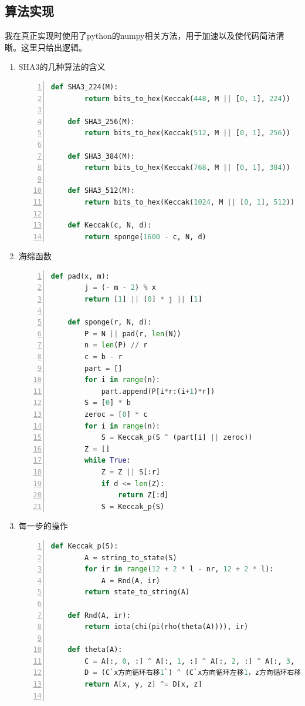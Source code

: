 \documentclass[11pt]{ctexart}
\begin{document}
\subsection{算法实现} %
我在真正实现时使用了python的numpy相关方法，用于加速以及使代码简洁清晰。这里只给出逻辑。
\begin{enumerate}
    \item SHA3的几种算法的含义
    \begin{lstlisting}[language={python},
    numbers=left,
    numberstyle=\tiny\monaco,
    basicstyle=\small\monaco]
    def SHA3_224(M):
        return bits_to_hex(Keccak(448, M || [0, 1], 224))

    def SHA3_256(M):
        return bits_to_hex(Keccak(512, M || [0, 1], 256))

    def SHA3_384(M):
        return bits_to_hex(Keccak(768, M || [0, 1], 384))

    def SHA3_512(M):
        return bits_to_hex(Keccak(1024, M || [0, 1], 512))

    def Keccak(c, N, d):
        return sponge(1600 - c, N, d)
    \end{lstlisting}
    \item 海绵函数
    \begin{lstlisting}[language={python},
    numbers=left,
    numberstyle=\tiny\monaco,
    basicstyle=\small\monaco]
    def pad(x, m):
        j = (- m - 2) % x
        return [1] || [0] * j || [1]

    def sponge(r, N, d):
        P = N || pad(r, len(N))
        n = len(P) // r
        c = b - r
        part = []
        for i in range(n):
            part.append(P[i*r:(i+1)*r])
        S = [0] * b
        zeroc = [0] * c
        for i in range(n):
            S = Keccak_p(S ^ (part[i] || zeroc))
        Z = []
        while True:
            Z = Z || S[:r]
            if d <= len(Z):
                return Z[:d]
            S = Keccak_p(S)
    \end{lstlisting}
    \item 每一步的操作
    \begin{lstlisting}[language={python},
    numbers=left,
    numberstyle=\tiny\monaco,
    basicstyle=\small\monaco]
    def Keccak_p(S):
        A = string_to_state(S)
        for ir in range(12 + 2 * l - nr, 12 + 2 * l):
            A = Rnd(A, ir)
        return state_to_string(A)

    def Rnd(A, ir):
        return iota(chi(pi(rho(theta(A)))), ir)

    def theta(A):
        C = A[:, 0, :] ^ A[:, 1, :] ^ A[:, 2, :] ^ A[:, 3, :] ^ A[:, 4, :]
        D = (C`x方向循环右移1`) ^ (C`x方向循环左移1，z方向循环右移1`)
        return A[x, y, z] ^= D[x, z]


\end{lstlisting}
\end{enumerate}
\end{document}

